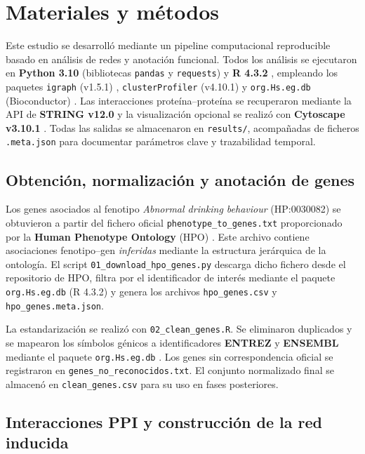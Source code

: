 \section{Materiales y métodos}

Este estudio se desarrolló mediante un pipeline computacional reproducible basado en análisis de redes y anotación funcional. Todos los análisis se ejecutaron en \textbf{Python 3.10} \cite{Python_2023} (bibliotecas \texttt{pandas} \cite{McKinney2010_pandas} y \texttt{requests}) y \textbf{R 4.3.2} \cite{R_core_2023}, empleando los paquetes \texttt{igraph} (v1.5.1) \cite{Csardi2006_igraph}, \texttt{clusterProfiler} (v4.10.1) \cite{Yu2012_clusterProfiler} y \texttt{org.Hs.eg.db} (Bioconductor) \cite{bioc_manual}. Las interacciones proteína–proteína se recuperaron mediante la API de \textbf{STRING v12.0} \cite{Szklarczyk2019_STRING} y la visualización opcional se realizó con \textbf{Cytoscape v3.10.1} \cite{Shannon2003_cytoscape}. Todas las salidas se almacenaron en \texttt{results/}, acompañadas de ficheros \texttt{.meta.json} para documentar parámetros clave y trazabilidad temporal.

\subsection{Obtención, normalización y anotación de genes}

Los genes asociados al fenotipo \textit{Abnormal drinking behaviour} (HP:0030082) se obtuvieron a partir del fichero oficial \texttt{phenotype\_to\_genes.txt} proporcionado por la \textbf{Human Phenotype Ontology} (HPO) \cite{robinson2008hpo, kohler2021hpo}. Este archivo contiene asociaciones fenotipo–gen \textit{inferidas} mediante la estructura jerárquica de la ontología. El script \texttt{01\_download\_hpo\_genes.py} descarga dicho fichero desde el repositorio de HPO, filtra por el identificador de interés mediante el paquete \texttt{org.Hs.eg.db} (R 4.3.2) y genera los archivos \texttt{hpo\_genes.csv} y \texttt{hpo\_genes.meta.json}.

La estandarización se realizó con \texttt{02\_clean\_genes.R}. Se eliminaron duplicados y se mapearon los símbolos génicos a identificadores \textbf{ENTREZ} y \textbf{ENSEMBL} mediante el paquete \texttt{org.Hs.eg.db} \cite{bioc_manual}. Los genes sin correspondencia oficial se registraron en \texttt{genes\_no\_reconocidos.txt}. El conjunto normalizado final se almacenó en \texttt{clean\_genes.csv} para su uso en fases posteriores.

\subsection{Interacciones PPI y construcción de la red inducida}

